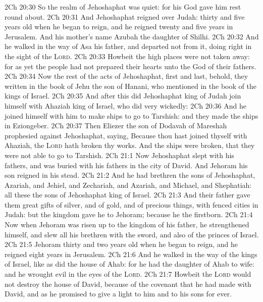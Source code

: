 \vs 2Ch 20:30 So the realm of Jehoshaphat was quiet: for his God gave him rest round about.
\vs 2Ch 20:31 And Jehoshaphat reigned over Judah:  thirty and five years old when he began to reign, and he reigned twenty and five years in Jerusalem. And his mother's name  Azubah the daughter of Shilhi.
\vs 2Ch 20:32 And he walked in the way of Asa his father, and departed not from it, doing  right in the sight of the \textsc{Lord}.
\vs 2Ch 20:33 Howbeit the high places were not taken away: for as yet the people had not prepared their hearts unto the God of their fathers.
\vs 2Ch 20:34 Now the rest of the acts of Jehoshaphat, first and last, behold, they  written in the book of Jehu the son of Hanani, who  mentioned in the book of the kings of Israel.
\vs 2Ch 20:35 And after this did Jehoshaphat king of Judah join himself with Ahaziah king of Israel, who did very wickedly:
\vs 2Ch 20:36 And he joined himself with him to make ships to go to Tarshish: and they made the ships in Eziongeber.
\vs 2Ch 20:37 Then Eliezer the son of Dodavah of Mareshah prophesied against Jehoshaphat, saying, Because thou hast joined thyself with Ahaziah, the \textsc{Lord} hath broken thy works. And the ships were broken, that they were not able to go to Tarshish.
\vs 2Ch 21:1 Now Jehoshaphat slept with his fathers, and was buried with his fathers in the city of David. And Jehoram his son reigned in his stead.
\vs 2Ch 21:2 And he had brethren the sons of Jehoshaphat, Azariah, and Jehiel, and Zechariah, and Azariah, and Michael, and Shephatiah: all these  the sons of Jehoshaphat king of Israel.
\vs 2Ch 21:3 And their father gave them great gifts of silver, and of gold, and of precious things, with fenced cities in Judah: but the kingdom gave he to Jehoram; because he  the firstborn.
\vs 2Ch 21:4 Now when Jehoram was risen up to the kingdom of his father, he strengthened himself, and slew all his brethren with the sword, and  also of the princes of Israel.
\vs 2Ch 21:5 Jehoram  thirty and two years old when he began to reign, and he reigned eight years in Jerusalem.
\vs 2Ch 21:6 And he walked in the way of the kings of Israel, like as did the house of Ahab: for he had the daughter of Ahab to wife: and he wrought  evil in the eyes of the \textsc{Lord}.
\vs 2Ch 21:7 Howbeit the \textsc{Lord} would not destroy the house of David, because of the covenant that he had made with David, and as he promised to give a light to him and to his sons for ever.
